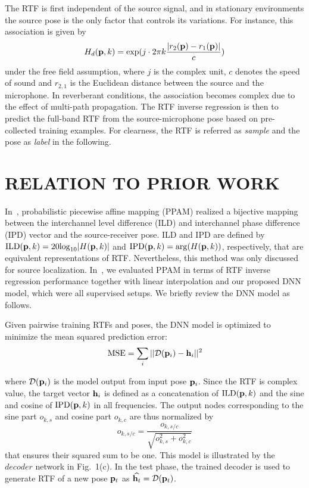 \documentclass{article}
\begin{document}
The RTF is first independent of the source signal, and in stationary environments the source pose is the only factor that controls its variations. For instance, this association is given by
\begin{equation}\label{eq:green}
  H_d({\bf p},k)={\text{exp}(j\cdot 2\pi k \frac{|r_2({\bf p}) - r_1({\bf p})|}{c})}
\end{equation}
under the free field assumption, where $j$ is the complex unit, $c$ denotes the speed of sound and $r_{2,1}$ is the Euclidean distance between the source and the microphone. In reverberant conditions, the association becomes complex due to the effect of multi-path propagation. The RTF inverse regression is then to predict the full-band RTF from the source-microphone pose based on pre-collected training examples. For clearness, the RTF is referred as \emph{sample} and the pose as \emph{label} in the following.

\section{RELATION TO PRIOR WORK}


In~\cite{deleforge2015acoustic}, probabilistic piecewise affine mapping (PPAM) realized a bijective mapping between the interchannel level difference (ILD) and interchannel phase difference (IPD) vector and the source-receiver pose. ILD and IPD are defined by $\text{ILD}({\bf p}, k)=20{\rm log}_{10}|H({\bf p}, k)|$ and $\text{IPD}({\bf p}, k)={\rm arg}(H({\bf p}, k))$, respectively, that are equivalent representations of RTF. Nevertheless, this method was only discussed for source localization. In~\cite{rtfinv2017}, we evaluated PPAM in terms of RTF inverse regression performance together with linear interpolation and our proposed DNN model, which were all supervised setups. We briefly review the DNN model as follows.

Given pairwise training RTFs and poses, the DNN model is optimized to minimize the mean squared prediction error:
\begin{equation}\label{eq:Dmmse}
  \text{MSE} = \sum_{i}||\mathcal{D}({\bf p}_i) - {\bf h}_i||^2
\end{equation}

where $\mathcal{D}({\bf p}_i)$ is the model output from input pose ${\bf p}_i$. Since the RTF is complex value, the target vector ${\bf h}_i$ is defined as a concatenation of $\text{ILD}({\bf p}, k)$ and the sine and cosine of $\text{IPD}({\bf p}, k)$ in all frequencies. The output nodes corresponding to the sine part $o_{k,s}$ and cosine part $o_{k,c}$ are thus normalized by
\begin{equation}\label{eq:ln}
  o_{k,s/c}=\frac{o_{k,s/c}}{\sqrt{o_{k,s}^2+o_{k,c}^2}}
\end{equation}
that ensures their squared sum to be one. This model is illustrated by the $decoder$ network in Fig.~1(c). In the test phase, the trained decoder is used to generate RTF of a new pose ${\bf p}_t$ as $\widehat{{\bf h}_t}=\mathcal{D}({\bf p}_t)$.
\end{document}
